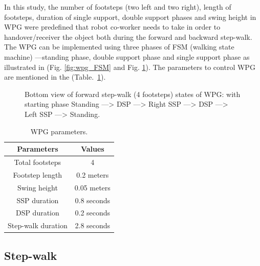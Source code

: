 In this study, the number of footsteps (two left and two right), length of footsteps, duration of single support, double support phases and swing height in WPG were predefined that robot co-worker needs to take in order to handover/receiver the object both during the forward and backward step-walk. The WPG can be implemented using three phases of FSM (walking state machine) ---standing phase, double support phase and single support phase as illustrated in (Fig. \ref{fig:wpg_FSM} and Fig. \ref{fig:fwdWalk}). The parameters to control WPG are mentioned in the (Table.~\ref{wpgParam}).


\begin{figure}[hptb]
	\caption{Bottom view of forward step-walk (4 footsteps) states of WPG: with starting phase Standing ---> DSP ---> Right SSP ---> DSP ---> Left SSP ---> Standing.}
	\label{fig:fwdWalk}
\end{figure}


\begin{table}[hbt]
	\caption{WPG parameters.}
	\label{wpgParam}
	\begin{center}
		\begin{tabular}{|c | c|}
			\hline  
			{\bf Parameters} &  {\bf Values} \\ 
			\hline			
			Total footsteps & 4\\ 
			\hline			
			Footstep length & 0.2 meters\\ 
			\hline
			Swing height & 0.05 meters\\
			\hline			
			SSP duration & 0.8 seconds\\ 
			\hline
			DSP duration & 0.2 seconds\\
			\hline
			Step-walk duration & 2.8 seconds\\			
			\hline 			
		\end{tabular} 
	\end{center}
\end{table}




\subsection{Step-walk}

